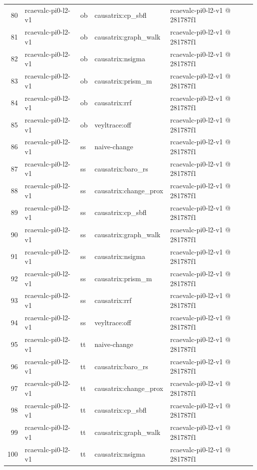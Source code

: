 \begin{longtable}{@{}r>{\raggedright\arraybackslash}p{87.0pt}>{\raggedright\arraybackslash}p{18.0pt}>{\raggedright\arraybackslash}p{63.0pt}>{\raggedright\arraybackslash}p{108.0pt}@{}}
80 & rcaevalc-pi0-l2-v1 & ob & causatrix:cp\_sbfl & rcaevalc-pi0-l2-v1 @ 281787f1 \\
81 & rcaevalc-pi0-l2-v1 & ob & causatrix:graph\_walk & rcaevalc-pi0-l2-v1 @ 281787f1 \\
82 & rcaevalc-pi0-l2-v1 & ob & causatrix:nsigma & rcaevalc-pi0-l2-v1 @ 281787f1 \\
83 & rcaevalc-pi0-l2-v1 & ob & causatrix:prism\_m & rcaevalc-pi0-l2-v1 @ 281787f1 \\
84 & rcaevalc-pi0-l2-v1 & ob & causatrix:rrf & rcaevalc-pi0-l2-v1 @ 281787f1 \\
85 & rcaevalc-pi0-l2-v1 & ob & veyltrace:off & rcaevalc-pi0-l2-v1 @ 281787f1 \\
86 & rcaevalc-pi0-l2-v1 & ss & naive-change & rcaevalc-pi0-l2-v1 @ 281787f1 \\
87 & rcaevalc-pi0-l2-v1 & ss & causatrix:baro\_rs & rcaevalc-pi0-l2-v1 @ 281787f1 \\
88 & rcaevalc-pi0-l2-v1 & ss & causatrix:change\_prox & rcaevalc-pi0-l2-v1 @ 281787f1 \\
89 & rcaevalc-pi0-l2-v1 & ss & causatrix:cp\_sbfl & rcaevalc-pi0-l2-v1 @ 281787f1 \\
90 & rcaevalc-pi0-l2-v1 & ss & causatrix:graph\_walk & rcaevalc-pi0-l2-v1 @ 281787f1 \\
91 & rcaevalc-pi0-l2-v1 & ss & causatrix:nsigma & rcaevalc-pi0-l2-v1 @ 281787f1 \\
92 & rcaevalc-pi0-l2-v1 & ss & causatrix:prism\_m & rcaevalc-pi0-l2-v1 @ 281787f1 \\
93 & rcaevalc-pi0-l2-v1 & ss & causatrix:rrf & rcaevalc-pi0-l2-v1 @ 281787f1 \\
94 & rcaevalc-pi0-l2-v1 & ss & veyltrace:off & rcaevalc-pi0-l2-v1 @ 281787f1 \\
95 & rcaevalc-pi0-l2-v1 & tt & naive-change & rcaevalc-pi0-l2-v1 @ 281787f1 \\
96 & rcaevalc-pi0-l2-v1 & tt & causatrix:baro\_rs & rcaevalc-pi0-l2-v1 @ 281787f1 \\
97 & rcaevalc-pi0-l2-v1 & tt & causatrix:change\_prox & rcaevalc-pi0-l2-v1 @ 281787f1 \\
98 & rcaevalc-pi0-l2-v1 & tt & causatrix:cp\_sbfl & rcaevalc-pi0-l2-v1 @ 281787f1 \\
99 & rcaevalc-pi0-l2-v1 & tt & causatrix:graph\_walk & rcaevalc-pi0-l2-v1 @ 281787f1 \\
100 & rcaevalc-pi0-l2-v1 & tt & causatrix:nsigma & rcaevalc-pi0-l2-v1 @ 281787f1 \\

\end{longtable}
